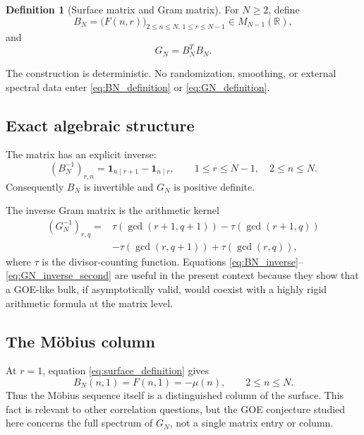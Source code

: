 \documentclass[11pt]{amsart}
\numberwithin{equation}{section}
\theoremstyle{plain}
\theoremstyle{definition}
\newtheorem{definition}[theorem]{Definition}
\theoremstyle{remark}
\newcommand{\mob}{\mu}
\begin{document}
\begin{definition}[Surface matrix and Gram matrix]
\label{def:surface_gram}
For $N\ge2$, define
\begin{equation}
B_N=\bigl(F(n,r)\bigr)_{2\le n\le N,\,1\le r\le N-1}
\in M_{N-1}(\mathbb R),
\label{eq:BN_definition}
\end{equation}
and
\begin{equation}
G_N=B_N^TB_N.
\label{eq:GN_definition}
\end{equation}
\end{definition}

The construction is deterministic.  No randomization, smoothing, or external spectral data enter \eqref{eq:BN_definition} or \eqref{eq:GN_definition}.

\subsection{Exact algebraic structure}
\label{subsec:exact_structure}

The matrix has an explicit inverse:
\begin{equation}
(B_N^{-1})_{r,n}
=
\mathbf 1_{n\mid r+1}-\mathbf 1_{n\mid r},
\qquad 1\le r\le N-1,\quad 2\le n\le N.
\label{eq:BN_inverse}
\end{equation}
Consequently $B_N$ is invertible and $G_N$ is positive definite.

The inverse Gram matrix is the arithmetic kernel
\begin{align}
(G_N^{-1})_{r,q}
={}&\tau(\gcd(r+1,q+1))-\tau(\gcd(r+1,q))
\label{eq:GN_inverse_first}\\
&-\tau(\gcd(r,q+1))+\tau(\gcd(r,q)),
\label{eq:GN_inverse_second}
\end{align}
where $\tau$ is the divisor-counting function.  Equations \eqref{eq:BN_inverse}--\eqref{eq:GN_inverse_second} are useful in the present context because they show that a GOE-like bulk, if asymptotically valid, would coexist with a highly rigid arithmetic formula at the matrix level.

\subsection{The M\"obius column}
\label{subsec:mobius_column}

At $r=1$, equation \eqref{eq:surface_definition} gives
\begin{equation}
B_N(n,1)=F(n,1)=-\mob(n),
\qquad 2\le n\le N.
\label{eq:first_column_mobius}
\end{equation}
Thus the M\"obius sequence itself is a distinguished column of the surface.  This fact is relevant to other correlation questions, but the GOE conjecture studied here concerns the full spectrum of $G_N$, not a single matrix entry or column.
\end{document}
